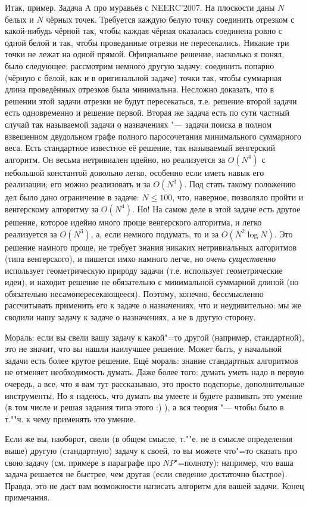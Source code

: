 \documentclass[a4paper,10pt]{problems}
\begin{document}
{Итак, пример. Задача A про муравьёв с NEERC'2007. На плоскости даны $N$ 
белых и $N$ чёрных точек. Требуется каждую белую точку соединить отрезком с 
какой-нибудь чёрной так, чтобы каждая чёрная оказалась соединена ровно с одной 
белой и так, чтобы проведанные отрезки не пересекались. Никакие три точки не 
лежат на одной прямой. Официальное решение, насколько я понял, было следующее: 
рассмотрим немного другую задачу: соединить попарно (чёрную с белой, как и в 
оригинальной задаче) точки так, чтобы суммарная длина проведённых отрезков была 
минимальна. Несложно доказать, что в решении этой задачи отрезки не будут 
пересекаться, т.е. решение второй задачи есть одновременно и решение первой. 
Вторая же задача есть по сути частный случай так называемой задачи о 
назначениях "--- задачи поиска в полном взвешенном двудольном графе полного 
паросочетания минимального суммарного веса. Есть стандартное известное её 
решение, так называемый венгерский алгоритм. Он весьма нетривиален идейно, но 
реализуется за $O(N^4)$ с небольшой константой довольно легко, особенно если 
иметь навык его реализации; его можно реализовать и за $O(N^3)$. Под стать такому положению дел было дано ограничение в 
задаче: $N\leq 100$, что, наверное, позволяло пройти и венгерскому алгоритму за 
$O(N^4)$. Но! На самом деле в этой задаче есть другое решение, которое идейно 
много проще венгерского алгоритма, и легко реализуется за $O(N^3)$, а, 
если немного подумать, то и за $O(N^2 \log N)$. Это решение намного проще, не 
требует знания никаких нетривиальных алгоритмов (типа венгерского), и пишется 
имхо намного легче, но \textit{очень существенно} использует геометрическую 
природу задачи (т.е. использует геометрические идеи), и находит решение не 
обязательно с минимальной суммарной длиной (но обязательно 
несамопересекающееся). Поэтому, конечно, бессмысленно рассчитывать применить 
его к задаче о назначениях, что и неудивительно: мы же сводили нашу задачу к 
задаче о назначениях, а не в другую сторону.

Мораль: если вы свели вашу задачу к какой"=то другой (например, стандартной), это не 
значит, что вы нашли наилучшее решение. Может быть, у начальной задачи есть 
более крутое решение. Ещё мораль: знание стандартных алгоритмов не 
отменяет необходимость думать. Даже более того: думать уметь надо в первую 
очередь, а все, что я вам тут рассказываю, это просто подспорье, дополнительные 
инструменты. Но я надеюсь, что думать вы умеете и будете развивать это умение 
(в том числе и решая задания типа этого :) ), а вся теория "--- чтобы было в 
т.""ч. к чему применять это умение.

Если же вы, наоборот, свели (в общем смысле, т.""е. не в смысле определения 
выше) другую (стандартную) задачу к своей, то вы можете  что"=то сказать про свою задачу (см. 
примере в параграфе про $NP$"=полноту): например, что ваша задача решается не 
быстрее, чем другая (если сведение достаточно быстрое). Правда, это не даст вам 
возможности написать алгоритм для вашей задачи. Конец примечания.}
\end{document}
